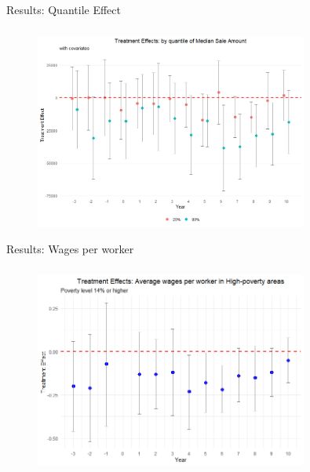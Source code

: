 \documentclass{beamer}
\begin{document}
\begin{frame}{Results: Quantile Effect}
    \frametitle{}
    \begin{figure}[htbp]
        \centering
        \includegraphics[width=0.8\textwidth]{assets/imgs/tes_qte_covs.png}
        \label{fig:tes_qte}
    \end{figure}
\end{frame}

\begin{frame}{Results: Wages per worker}
    \frametitle{}
    \begin{figure}[htbp]
        \centering
        \includegraphics[width=0.8\textwidth]{assets/imgs/tes_wages_per_emp_hp.png}
        \label{fig:tes_wages}
    \end{figure}
\end{frame}

\end{document}
